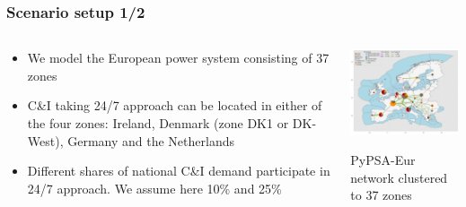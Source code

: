 \begin{frame}
  \frametitle{Scenario setup 1/2}

\begin{columns}[T]
\begin{column}{6cm}

  \begin{itemize}

  \item We model the European power system consisting of \alert{37 zones}
  \item C\&I taking 24/7 approach can be located in either of the \alert{four zones}: Ireland, Denmark (zone DK1 or DK-West), Germany and the Netherlands
  \item Different shares of national C\&I demand participate in 24/7 approach. We assume here \alert{10\%} and \alert{25\%}
  \end{itemize}

\end{column}

\begin{column}{8cm}

\centering
\includegraphics[width=8cm]{images/elec_s_37.png}

\vspace{0.1cm}
PyPSA-Eur network clustered to 37 zones

\end{column}
\end{columns}

\end{frame}



